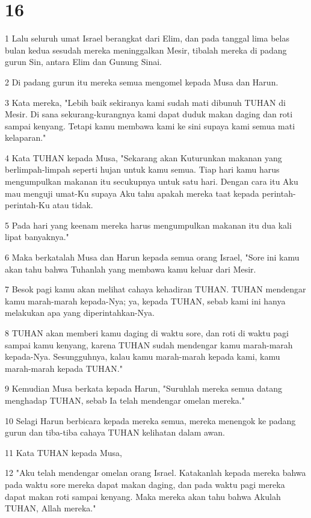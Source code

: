 \chapter{16}

\par 1 Lalu seluruh umat Israel berangkat dari Elim, dan pada tanggal lima belas bulan kedua sesudah mereka meninggalkan Mesir, tibalah mereka di padang gurun Sin, antara Elim dan Gunung Sinai.
\par 2 Di padang gurun itu mereka semua mengomel kepada Musa dan Harun.
\par 3 Kata mereka, "Lebih baik sekiranya kami sudah mati dibunuh TUHAN di Mesir. Di sana sekurang-kurangnya kami dapat duduk makan daging dan roti sampai kenyang. Tetapi kamu membawa kami ke sini supaya kami semua mati kelaparan."
\par 4 Kata TUHAN kepada Musa, "Sekarang akan Kuturunkan makanan yang berlimpah-limpah seperti hujan untuk kamu semua. Tiap hari kamu harus mengumpulkan makanan itu secukupnya untuk satu hari. Dengan cara itu Aku mau menguji umat-Ku supaya Aku tahu apakah mereka taat kepada perintah-perintah-Ku atau tidak.
\par 5 Pada hari yang keenam mereka harus mengumpulkan makanan itu dua kali lipat banyaknya."
\par 6 Maka berkatalah Musa dan Harun kepada semua orang Israel, "Sore ini kamu akan tahu bahwa Tuhanlah yang membawa kamu keluar dari Mesir.
\par 7 Besok pagi kamu akan melihat cahaya kehadiran TUHAN. TUHAN mendengar kamu marah-marah kepada-Nya; ya, kepada TUHAN, sebab kami ini hanya melakukan apa yang diperintahkan-Nya.
\par 8 TUHAN akan memberi kamu daging di waktu sore, dan roti di waktu pagi sampai kamu kenyang, karena TUHAN sudah mendengar kamu marah-marah kepada-Nya. Sesungguhnya, kalau kamu marah-marah kepada kami, kamu marah-marah kepada TUHAN."
\par 9 Kemudian Musa berkata kepada Harun, "Suruhlah mereka semua datang menghadap TUHAN, sebab Ia telah mendengar omelan mereka."
\par 10 Selagi Harun berbicara kepada mereka semua, mereka menengok ke padang gurun dan tiba-tiba cahaya TUHAN kelihatan dalam awan.
\par 11 Kata TUHAN kepada Musa,
\par 12 "Aku telah mendengar omelan orang Israel. Katakanlah kepada mereka bahwa pada waktu sore mereka dapat makan daging, dan pada waktu pagi mereka dapat makan roti sampai kenyang. Maka mereka akan tahu bahwa Akulah TUHAN, Allah mereka."
